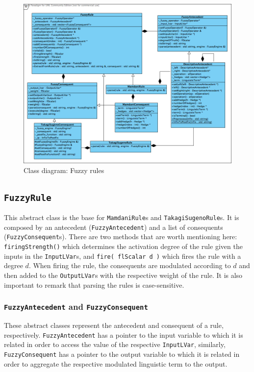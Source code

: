 		\begin{landscape}
			\begin{figure}[ht]
				\centering
				\includegraphics[scale=0.58]{./figures/fuzzy-rules.png}
				\caption{Class diagram: Fuzzy rules}
				\label{f:fuzzy-rules}
			\end{figure}
		\end{landscape}
		
		\subsection{\texttt{FuzzyRule}}
			This abstract class is the base for \texttt{MamdaniRule}s and \texttt{TakagiSugenoRule}s. It is composed by an antecedent (\texttt{FuzzyAntecedent}) and a list of consequents (\texttt{FuzzyConsequent}s). There are two methods that are worth mentioning here: \texttt{firingStrength()} which determines the activation degree of the rule given the inputs in the \texttt{InputLVar}s, and \texttt{fire( flScalar d )} which fires the rule with a degree $d$. When firing the rule, the consequents are modulated according to $d$ and then added to the \texttt{OutputLVar}s with the respective weight of the rule. It is also important to remark that parsing the rules is case-sensitive.
			
		\subsubsection{\texttt{FuzzyAntecedent} and \texttt{FuzzyConsequent}}
			These abstract classes represent the antecedent and consequent of a rule, respectively. \texttt{FuzzyAntecedent} has a pointer to the input variable to which it is related in order to access the value of the respective \texttt{InputLVar}, similarly, \texttt{FuzzyConsequent} has a pointer to the output variable to which it is related in order to aggregate the respective modulated linguistic term to the output.
			

